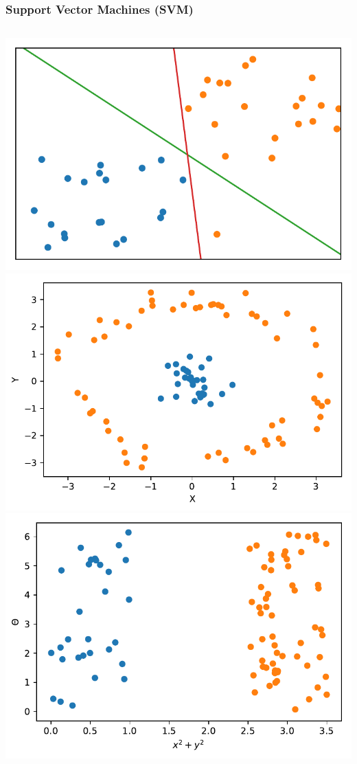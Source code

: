 \documentclass[aspectratio=169]{beamer}
\begin{document}
\begin{frame}
	\frametitle{Support Vector Machines (SVM)}
	\begin{columns}
		\includegraphics[width=1.0\textwidth]{imgs/svm_2.pdf}
		\includegraphics[width=1.0\textwidth]{imgs/svm_3.pdf}
		\includegraphics[width=1.0\textwidth]{imgs/svm_4.pdf}

\end{columns}
\end{frame}
\end{document}
